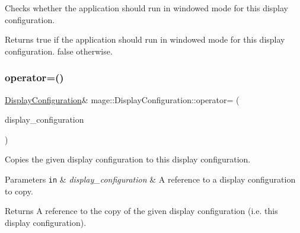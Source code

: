 Checks whether the application should run in windowed mode for this display configuration.

\begin{DoxyReturn}{Returns}
{\ttfamily true} if the application should run in windowed mode for this display configuration. {\ttfamily false} otherwise. 
\end{DoxyReturn}
\hypertarget{structmage_1_1_display_configuration_a43d4997e418b27add46442e88ba3672b}{}\label{structmage_1_1_display_configuration_a43d4997e418b27add46442e88ba3672b} 
\subsubsection{\texorpdfstring{operator=()}{operator=()}\hspace{0.1cm}{\footnotesize\ttfamily [1/2]}}
{\footnotesize\ttfamily \hyperlink{structmage_1_1_display_configuration}{Display\+Configuration}\& mage\+::\+Display\+Configuration\+::operator= (\begin{DoxyParamCaption}\item[{const \hyperlink{structmage_1_1_display_configuration}{Display\+Configuration} \&}]{display\+\_\+configuration }\end{DoxyParamCaption})\hspace{0.3cm}{\ttfamily [default]}}

Copies the given display configuration to this display configuration.


\begin{DoxyParams}[1]{Parameters}
\mbox{\tt in}  & {\em display\+\_\+configuration} & A reference to a display configuration to copy. \\
\hline
\end{DoxyParams}
\begin{DoxyReturn}{Returns}
A reference to the copy of the given display configuration (i.\+e. this display configuration). 
\end{DoxyReturn}
\hypertarget{structmage_1_1_display_configuration_a56c175220b8f597afd7d5d6275b5d0de}{}\label{structmage_1_1_display_configuration_a56c175220b8f597afd7d5d6275b5d0de} 
